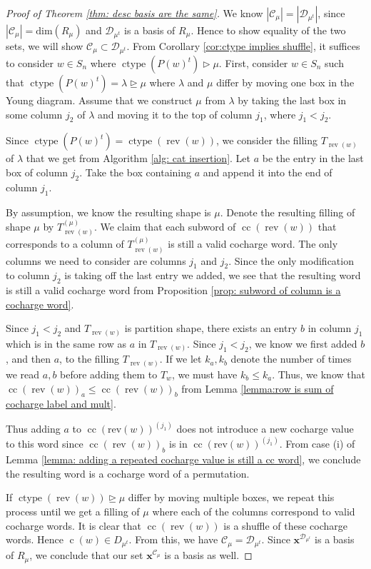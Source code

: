 \documentclass[10pt]{amsart}
\theoremstyle{plain}
\theoremstyle{definition}
\theoremstyle{plain}
\theoremstyle{plain}
\theoremstyle{remark}
\theoremstyle{plain}
\theoremstyle{plain}
\DeclareMathOperator{\ctype}{ctype}
\DeclareMathOperator{\rev}{rev}
\DeclareMathOperator{\cc}{cc}
\DeclareMathOperator{\cw}{c}
\begin{document}
\begin{proof}[Proof of  Theorem \ref{thm: desc basis are the same}]
We know $|\mathcal{C}_\mu| = |\mathcal{D}_{\mu^t}|$, since $|\mathcal{C}_\mu| = \text{dim}(R_{\mu})$ and $\mathcal{D}_{\mu^t}$ is a basis of $R_{\mu}$.
Hence to show equality of the two sets, we will show $\mathcal{C}_\mu \subset \mathcal{D}_{\mu^t}$.
From Corollary \ref{cor:ctype implies shuffle}, it suffices to consider $w\in S_n$ where $\ctype(P(w)^t) \rhd \mu$.
First, consider $w\in S_n$ such that $\ctype(P(w)^t)  = \lambda\unrhd \mu$ where $\lambda$ and $\mu$ differ by moving one box in the Young diagram. 
Assume that we construct $\mu$ from $\lambda$ by taking the last box in some column $j_2$ of $\lambda$ and moving it to the top of column $j_1$, where $j_1< j_2$. 


Since $\ctype(P(w)^t) = \ctype(\rev(w))$, we consider the filling $T_{\rev(w)}$ of $\lambda$ that we get from Algorithm \ref{alg: cat insertion}.
Let $a$ be the entry in the last box of column $j_2$. 
Take the box containing $a$ and append it into the end of column $j_1$.

By assumption, we know the resulting shape is $\mu$. Denote the resulting filling of shape $\mu$ by $T_{\rev(w)}^{(\mu)}$. 
We claim that each subword of $\cc(\rev(w))$ that corresponds to a column of $T_{\rev(w)}^{(\mu)}$ is still a valid cocharge word.
The only columns we need to consider are columns $j_1$ and $j_2$. Since the only modification to column $j_2$ is taking off the last entry we added, we see that the resulting word is still a valid cocharge word from Proposition \ref{prop: subword of column is a cocharge word}.

Since $j_1< j_2$ and $T_{\rev(w)}$ is partition shape, there exists an entry $b$ in column $j_1$ which is in the same row as $a$ in $T_{\rev(w)}$. Since $j_1<j_2$, we know we first added $b$, and then $a$, to the filling $T_{\rev(w)}$.  If we let $k_a, k_b$ denote the number of times we read $a,b$ before adding them to $T_w$, we must have $k_b \leq  k_a$. Thus, we know that $\cc(\rev(w))_a \leq  \cc(\rev(w))_b$ from Lemma \ref{lemma:row is sum of cocharge label and mult}. 

Thus adding $a$ to $\cc(\text{rev}(w))^{(j_1)}$ does not introduce a new cocharge value to this word since $\cc(\rev(w))_b$ is in $\cc(\text{rev}(w))^{(j_1)}$.
From case (i) of Lemma \ref{lemma: adding a repeated cocharge value is still a cc word}, we conclude the resulting word is a cocharge word of a permutation. 

If $\ctype(\rev(w))\unrhd \mu$ differ by moving multiple boxes, we repeat this process until we get a filling of $\mu$ where each of the columns correspond to valid cocharge words. It is clear that $\cc(\rev(w))$ is a shuffle of these cocharge words.
Hence $\cw(w) \in D_{\mu^t}$.
From this, we have $\mathcal{C}_\mu = \mathcal{D}_{\mu^t}$. Since $\mathbf{x}^{\mathcal{D}_{\mu^t}}$ is a basis of $R_{\mu}$, we conclude that our set  $\mathbf{x}^{\mathcal{C}_\mu}$  is a basis as well.
\end{proof}
\end{document}
